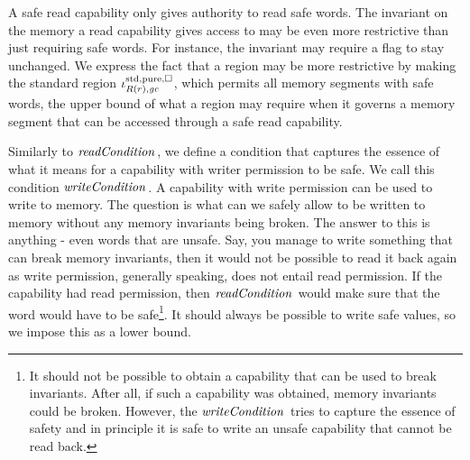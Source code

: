 \begin{jversion}
A safe read capability only gives authority to read safe words.
The invariant on the memory a read capability gives access to may be even more restrictive than just requiring safe words.
For instance, the invariant may require a flag to stay unchanged.
We express the fact that a region may be more restrictive by making the standard region $\iota^{\mathrm{std},\mathrm{pure},\square}_{R(r),\mathit{gc}}$, which permits all memory segments with safe words, the upper bound of what a region may require when it governs a memory segment that can be accessed through a safe read capability.


Similarly to $\readCond[]{}$, we define a condition that captures the essence of what it means for a capability with writer permission to be safe.
We call this condition $\writeCond[]{}$.
A capability with write permission can be used to write to memory.
The question is what can we safely allow to be written to memory without any memory invariants being broken.
The answer to this is anything - even words that are unsafe.
Say, you manage to write something that can break memory invariants, then it would not be possible to read it back again as write permission, generally speaking, does not entail read permission.
If the capability had read permission, then $\readCond[]{}$ would make sure that the word would have to be safe\footnote{It should not be possible to obtain a capability that can be used to break invariants. After all, if such a capability was obtained, memory invariants could be broken.
  However, the $\writeCond[]{}$ tries to capture the essence of safety and in principle it is safe to write an unsafe capability that cannot be read back.}.
It should always be possible to write safe values, so we impose this as a lower bound.


\end{jversion}

